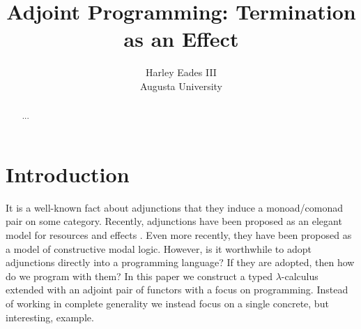 \usepackage{amssymb,amsmath,amsthm}
\usepackage{stmaryrd}
\usepackage{todonotes}
\usepackage{mathpartir}
\usepackage{enumerate}
\usepackage{hyperref}
\usepackage{cmll}

\usepackage[barr]{xy}
\let\mto\to
\let\to\rightarrow

\usepackage{color}
\usepackage{supertabular}




\newcommand{\cat}[1]{\mathcal{#1}}
\newcommand{\uar}[0]{\mathop{\uparrow}}
\newcommand{\dar}[0]{\mathop{\downarrow}}
\newcommand{\mst}[1]{\mathsf{m\text{-}st}_{#1}}
\newcommand{\cmst}[1]{\mathsf{cm\text{-}st}_{#1}}
\newcommand{\st}[1]{\mathsf{st}_{#1}}
\newcommand{\case}[0]{\mathsf{case}}
\newcommand{\cur}[1]{\mathsf{cur}(#1)}
\newcommand{\app}[0]{\mathsf{app}}
\newcommand{\id}[0]{\mathsf{id}}
\newcommand{\ifrName}[1]{#1}
\newcommand{\Hom}[2]{\mathsf{Hom}_{#1}(#2)}
\let\t\relax
\newcommand{\t}[0]{\mathsf{t}}
\newcommand{\m}[1]{\mathsf{m}_{#1}}
\newcommand{\n}[1]{\mathsf{n}_{#1}}
\newcommand{\p}[1]{\mathsf{p}_{#1}}
\newcommand{\q}[1]{\mathsf{q}_{#1}}
\newcommand{\limp}[0]{\multimap}

\title{Adjoint Programming: Termination as an Effect}

\author{Harley Eades III\\
  Augusta University}



\maketitle

\begin{abstract}
  ... 
\end{abstract}

\section{Introduction}
\label{sec:introduction}

It is a well-known fact about adjunctions that they induce a
monoad/comonad pair on some category.  Recently, adjunctions have been
proposed as an elegant model for resources and effects \cite{??}.
Even more recently, they have been proposed as a model of constructive
modal logic.  However, is it worthwhile to adopt adjunctions directly
into a programming language?  If they are adopted, then how do we
program with them?  In this paper we construct a typed
$\lambda$-calculus extended with an adjoint pair of functors with a
focus on programming.  Instead of working in complete generality we
instead focus on a single concrete, but interesting, example.

